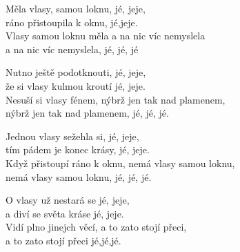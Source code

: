
\ve{}
Měla vlasy, samou loknu, jé, jeje,\\
ráno přistoupila k oknu, jé,jeje.\\
Vlasy samou loknu měla a na nic víc nemyslela\\
a na nic víc nemyslela, jé, jé, jé

\ve{}
Nutno ještě podotknouti, jé, jeje,\\
že si vlasy kulmou kroutí jé, jeje.\\
Nesuší si vlasy fénem, nýbrž jen tak nad plamenem,\\
nýbrž jen tak nad plamenem, jé, jé, jé.

\ve{}
Jednou vlasy sežehla si, jé, jeje,\\
tím pádem je konec krásy, jé, jeje.\\
Když přistoupí ráno k oknu, nemá vlasy samou loknu,\\
nemá vlasy samou loknu, jé, jé, jé.

\ve{}
O vlasy už nestará se jé, jeje,\\
a diví se světa kráse jé, jeje.\\
Vidí plno jinejch věcí, a to zato stojí přeci,\\
a to zato stojí přeci jé,jé,jé.

\esong